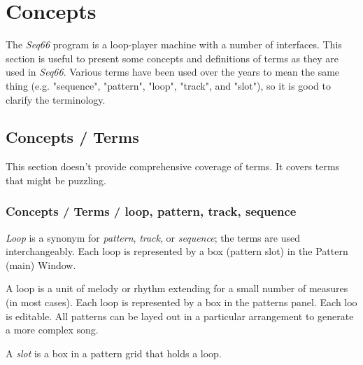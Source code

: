 %
%
%

\section{Concepts}
\label{sec:concepts}

   The \textsl{Seq66} program is a loop-player machine with a 
   number of interfaces.  This section is useful
   to present some concepts and definitions of terms as
   they are used in \textsl{Seq66}.  Various terms have been used over
   the years to mean the same thing (e.g. "sequence", "pattern", "loop",
   "track", and "slot"), so it is good to clarify the terminology.

\subsection{Concepts / Terms}
\label{subsec:concepts_terms}

   This section doesn't provide comprehensive coverage of terms.  It
   covers terms that might be puzzling.

\subsubsection{Concepts / Terms / loop, pattern, track, sequence}
\label{subsubsec:concepts_terms_loop}

   \textsl{Loop} is a synonym for \textsl{pattern}, \textsl{track},
   or \textsl{sequence}; the terms are used interchangeably.
   Each loop is represented by a box (pattern slot) in the Pattern (main)
   Window.

   A loop is a unit of melody or rhythm
   extending for a small number of measures (in most cases).
   Each loop is represented by a box in the patterns panel.
   Each loo is editable.  All patterns can be layed out in
   a particular arrangement to generate a more complex song.

   A \textsl{slot} is a box in a pattern grid that holds a loop.

